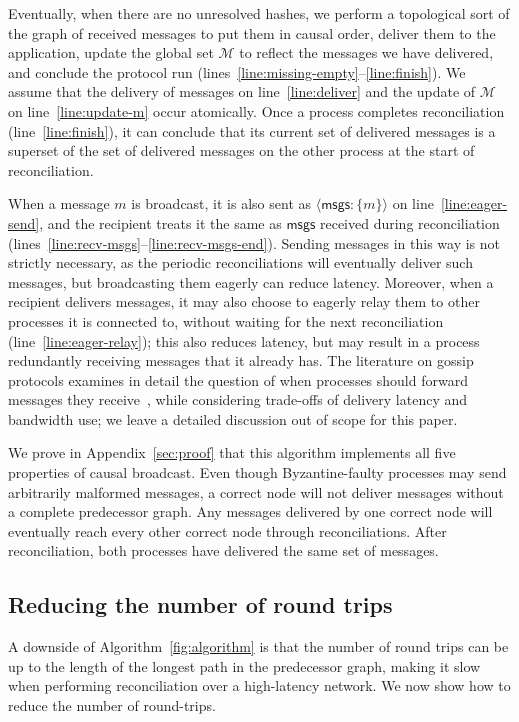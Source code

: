 \documentclass[a4paper,anonymous,USenglish]{lipics-v2019}
\begin{document}
Eventually, when there are no unresolved hashes, we perform a topological sort of the graph of received messages to put them in causal order, deliver them to the application, update the global set $\mathcal{M}$ to reflect the messages we have delivered, and conclude the protocol run (lines~\ref{line:missing-empty}--\ref{line:finish}).
We assume that the delivery of messages on line~\ref{line:deliver} and the update of $\mathcal{M}$ on line~\ref{line:update-m} occur atomically.
Once a process completes reconciliation (line~\ref{line:finish}), it can conclude that its current set of delivered messages is a superset of the set of delivered messages on the other process at the start of reconciliation.

When a message $m$ is broadcast, it is also sent as $\langle\mathsf{msgs}: \{m\}\rangle$ on line~\ref{line:eager-send}, and the recipient treats it the same as $\mathsf{msgs}$ received during reconciliation (lines~\ref{line:recv-msgs}--\ref{line:recv-msgs-end}).
Sending messages in this way is not strictly necessary, as the periodic reconciliations will eventually deliver such messages, but broadcasting them eagerly can reduce latency.
Moreover, when a recipient delivers messages, it may also choose to eagerly relay them to other processes it is connected to, without waiting for the next reconciliation (line~\ref{line:eager-relay}); this also reduces latency, but may result in a process redundantly receiving messages that it already has.
The literature on gossip protocols examines in detail the question of when processes should forward messages they receive~\cite{Leitao:2009fi}, while considering trade-offs of delivery latency and bandwidth use; we leave a detailed discussion out of scope for this paper.

We prove in Appendix~\ref{sec:proof} that this algorithm implements all five properties of causal broadcast.
Even though Byzantine-faulty processes may send arbitrarily malformed messages, a correct node will not deliver messages without a complete predecessor graph.
Any messages delivered by one correct node will eventually reach every other correct node through reconciliations.
After reconciliation, both processes have delivered the same set of messages.

\subsection{Reducing the number of round trips}\label{sec:algorithm2}

A downside of Algorithm~\ref{fig:algorithm} is that the number of round trips can be up to the length of the longest path in the predecessor graph, making it slow when performing reconciliation over a high-latency network.
We now show how to reduce the number of round-trips.
\end{document}
